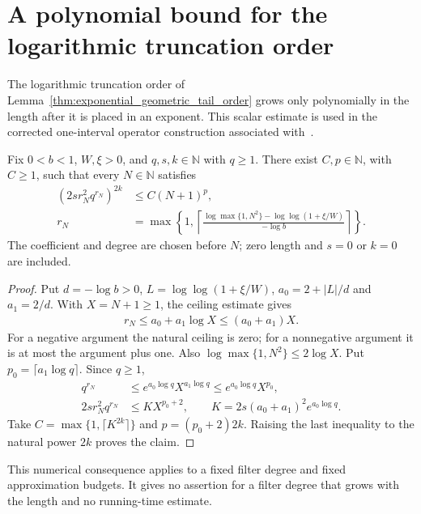\section{A polynomial bound for the logarithmic truncation order}
\label{sec:soft_heat_expansion}

The logarithmic truncation order of
Lemma~\ref{thm:exponential_geometric_tail_order} grows only polynomially
in the length after it is placed in an exponent. This scalar estimate is
used in the corrected one-interval operator construction associated
with~\cite[lines 1262--1268]{Arad2016RigorousRG}.

\begin{theorem}
    \label{thm:geometric_order_polynomial_bound}
    \leanok
    Fix $0<b<1$, $W,\xi>0$, and $q,s,k\in\mathbb N$ with $q\ge1$.
    There exist $C,p\in\mathbb N$, with $C\ge1$, such that every
    $N\in\mathbb N$ satisfies
    \begin{align}
        (2s r_N^2 q^{r_N})^{2k} & \le C(N+1)^p,  \\
        r_N                     & =\max\left\{1,
        \left\lceil\frac{\log\max\{1,N^2\}
                       -\log\log(1+\xi/W)}{-\log b}\right\rceil\right\}.
    \end{align}
    The coefficient and degree are chosen before $N$; zero length
    and $s=0$ or $k=0$ are included.
\end{theorem}
\begin{proof}\leanok
    Put $d=-\log b>0$, $L=\log\log(1+\xi/W)$,
    $a_0=2+|L|/d$ and $a_1=2/d$. With $X=N+1\ge1$, the ceiling
    estimate gives
    \begin{align}
        r_N\le a_0+a_1\log X\le(a_0+a_1)X.
    \end{align}
    For a negative argument the natural ceiling is zero; for a
    nonnegative argument it is at most the argument plus one.
    Also $\log\max\{1,N^2\}\le2\log X$.
    Put $p_0=\lceil a_1\log q\rceil$. Since $q\ge1$,
    \begin{align}
        q^{r_N}
         & \le e^{a_0\log q}X^{a_1\log q}
        \le e^{a_0\log q}X^{p_0},         \\
        2s r_N^2q^{r_N}
         & \le KX^{p_0+2},\qquad
        K=2s(a_0+a_1)^2e^{a_0\log q}.
    \end{align}
    Take $C=\max\{1,\lceil K^{2k}\rceil\}$ and $p=(p_0+2)2k$.
    Raising the last inequality to the natural power $2k$ proves the claim.
\end{proof}

This numerical consequence applies to a fixed filter degree and fixed
approximation budgets. It gives no assertion for a filter degree that
grows with the length and no running-time estimate.
